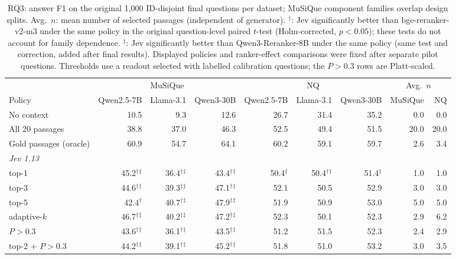 \begin{table}[t]
\centering
\footnotesize
\setlength{\tabcolsep}{4pt}
\caption{RQ3: answer F1 on the original 1{,}000 ID-disjoint final questions per dataset; MuSiQue component families overlap design splits. Avg.\ $n$: mean number of selected passages (independent of generator). $^\dagger$: Jev significantly better than bge-reranker-v2-m3 under the same policy in the original question-level paired $t$-test (Holm-corrected, $p<0.05$); these tests do not account for family dependence. $^\ddagger$: Jev significantly better than Qwen3-Reranker-8B under the same policy (same test and correction, added after final results). Displayed policies and ranker-effect comparisons were fixed after separate pilot questions. Thresholds use a readout selected with labelled calibration questions; the $P>0.3$ rows are Platt-scaled.}
\label{tab:rag}
\begin{tabular}{lrrrrrrrr}
\toprule
 & \multicolumn{3}{c}{MuSiQue} & \multicolumn{3}{c}{NQ} & \multicolumn{2}{c}{Avg.\ $n$} \\
Policy & Qwen2.5-7B & Llama-3.1 & Qwen3-30B & Qwen2.5-7B & Llama-3.1 & Qwen3-30B & MuSiQue & NQ \\
\midrule
No context & 10.5 & 9.3 & 12.6 & 26.7 & 31.4 & 35.2 & 0.0 & 0.0 \\
All 20 passages & 38.8 & 37.0 & 46.3 & 52.5 & 49.4 & 51.5 & 20.0 & 20.0 \\
Gold passages (oracle) & 60.9 & 54.7 & 64.1 & 60.2 & 59.1 & 59.7 & 2.6 & 3.4 \\
\multicolumn{9}{l}{\textit{Jev 1.13}} \\
\quad top-1 & 45.2$^\dagger$$^\ddagger$ & 36.4$^\dagger$$^\ddagger$ & 43.4$^\dagger$$^\ddagger$ & 50.4$^\ddagger$ & 50.4$^\dagger$$^\ddagger$ & 51.4$^\ddagger$ & 1.0 & 1.0 \\
\quad top-3 & 44.6$^\dagger$$^\ddagger$ & 39.3$^\dagger$$^\ddagger$ & 47.1$^\dagger$$^\ddagger$ & 52.1 & 50.5 & 52.9 & 3.0 & 3.0 \\
\quad top-5 & 42.4$^\dagger$ & 40.7$^\dagger$$^\ddagger$ & 47.9$^\dagger$$^\ddagger$ & 51.9 & 50.9 & 53.0 & 5.0 & 5.0 \\
\quad adaptive-$k$ & 46.7$^\dagger$$^\ddagger$ & 40.2$^\dagger$$^\ddagger$ & 47.2$^\dagger$$^\ddagger$ & 52.3 & 50.1 & 52.3 & 2.9 & 6.2 \\
\quad $P>0.3$ & 43.6$^\dagger$$^\ddagger$ & 36.1$^\dagger$$^\ddagger$ & 43.5$^\dagger$$^\ddagger$ & 51.2 & 51.5 & 52.3 & 2.4 & 2.9 \\
\quad top-2 $+$ $P>0.3$ & 44.2$^\dagger$$^\ddagger$ & 39.1$^\dagger$$^\ddagger$ & 45.2$^\dagger$$^\ddagger$ & 51.8 & 51.0 & 53.2 & 3.0 & 3.5 \\

\end{tabular}
\end{table}
